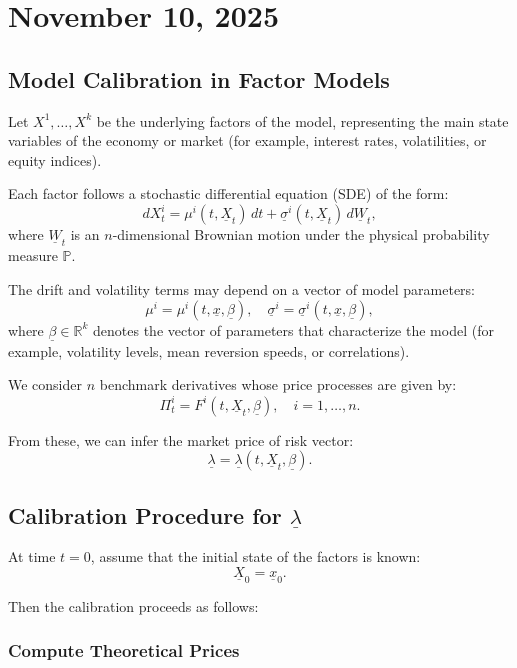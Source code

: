 \documentclass[12pt,a4paper]{article}
\theoremstyle{definition}
\newcommand{\R}{\mathbb{R}}
\begin{document}
\newpage
\section{November 10, 2025}

\subsection{Model Calibration in Factor Models}

Let $X^1, \ldots, X^k$ be the underlying factors of the model, representing the main state variables of the economy or market (for example, interest rates, volatilities, or equity indices).

Each factor follows a stochastic differential equation (SDE) of the form:
\[
dX_t^i = \mu^i(t, \underline{X}_t) \, dt + \underline{\sigma}^i(t, \underline{X}_t) \, d\underline{W}_t,
\]
where $\underline{W}_t$ is an $n$-dimensional Brownian motion under the physical probability measure $\mathbb{P}$.

The drift and volatility terms may depend on a vector of model parameters:
\[
\mu^i = \mu^i(t, \underline{x}, \underline{\beta}), \quad \underline{\sigma}^i = \underline{\sigma}^i(t, \underline{x}, \underline{\beta}),
\]
where $\underline{\beta} \in \R^k$ denotes the vector of parameters that characterize the model (for example, volatility levels, mean reversion speeds, or correlations).

We consider $n$ benchmark derivatives whose price processes are given by:
\[
\Pi_t^i = F^i(t, \underline{X}_t, \underline{\beta}), \quad i = 1, \ldots, n.
\]

From these, we can infer the market price of risk vector:
\[
\underline{\lambda} = \underline{\lambda}(t, \underline{X}_t, \underline{\beta}).
\]

\subsection{Calibration Procedure for $\underline{\lambda}$}

At time $t = 0$, assume that the initial state of the factors is known:
\[
\underline{X}_0 = \underline{x}_0.
\]

Then the calibration proceeds as follows:

\subsubsection{Compute Theoretical Prices}
\end{document}
